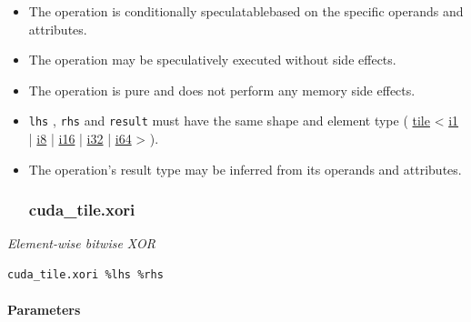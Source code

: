 \documentclass{article}
\begin{document}
\begin{itemize}
\item The operation is conditionally speculatablebased on the specific operands and attributes.
\item The operation may be speculatively executed without side effects.
\item The operation is pure and does not perform any memory side effects.
\item \texttt{lhs} , \texttt{rhs} and \texttt{result} must have the same shape and element type ( \href{https://docs.nvidia.com/cuda/tile-ir/latest/sections/types.html#type-tile}{tile} < \href{https://docs.nvidia.com/cuda/tile-ir/latest/sections/types.html#subsection-element-types}{i1} | \href{https://docs.nvidia.com/cuda/tile-ir/latest/sections/types.html#subsection-element-types}{i8} | \href{https://docs.nvidia.com/cuda/tile-ir/latest/sections/types.html#subsection-element-types}{i16} | \href{https://docs.nvidia.com/cuda/tile-ir/latest/sections/types.html#subsection-element-types}{i32} | \href{https://docs.nvidia.com/cuda/tile-ir/latest/sections/types.html#subsection-element-types}{i64} > ).
\item The operation's result type may be inferred from its operands and attributes.


\subsubsection{cuda\_tile.xori}

\end{itemize}
\textit{Element-wise bitwise XOR}


\begin{lstlisting}
cuda_tile.xori %lhs %rhs
\end{lstlisting}

\paragraph{Parameters}
\end{document}
